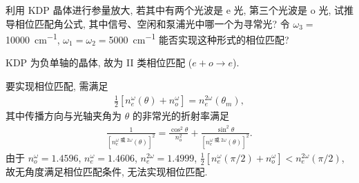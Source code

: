 \documentclass{assignment}
\begin{document}
\begin{prob}
    利用 KDP 晶体进行参量放大, 若其中有两个光波是 e 光, 第三个光波是 o 光, 试推导相位匹配角公式, 其中信号、空闲和泵浦光中哪一个为寻常光? 令 $\omega_3=$\SI{10000}{cm^{-1}}, $\omega_1=\omega_2=$\SI{5000}{cm^{-1}} 能否实现这种形式的相位匹配?
\end{prob}
\begin{sol}
    KDP 为负单轴的晶体, 故为 II 类相位匹配 ($e+o\rightarrow e$).

    要实现相位匹配, 需满足
    \begin{align}
        \frac{1}{2}[n_e^{\omega}(\theta)+n_o^{\omega}]=n_e^{2\omega}(\theta_m),
    \end{align}
    其中传播方向与光轴夹角为 $\theta$ 的非常光的折射率满足
    \begin{align}
        \frac{1}{[n_e^{\omega\text{ 或 }2\omega}(\theta)]^2}=\frac{\cos^2\theta}{n_o^2}+\frac{\sin^2\theta}{[n_e^{\omega\text{ 或 }2\omega}(\theta)]^2}.
    \end{align}
    由于 $n_o^{\omega}=1.4596$, $n_e^{\omega}=1.4606$, $n_e^{2\omega}=1.4999$, $\frac{1}{2}[n_e^{\omega}(\pi/2)+n_o^{\omega}]<n_e^{2\omega}(\pi/2)$, 故无角度满足相位匹配条件, 无法实现相位匹配.
\end{sol}
\end{document}
